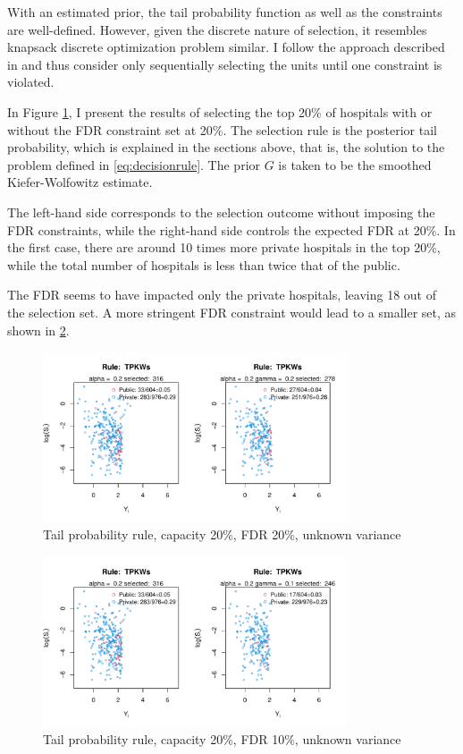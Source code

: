 \documentclass[12pt]{article}
\begin{document}
With an estimated prior, the tail probability function as well as the
constraints are well-defined. However, given the discrete nature of selection,
it resembles knapsack discrete optimization problem similar. I follow the
approach described in \cite{basu2018weighted} and thus consider only
sequentially selecting the units until one constraint is violated.

In Figure \ref{fig:tp_0.2_0.2_2d}, I present the results of selecting the top
20\% of hospitals with or without the FDR constraint set at 20\%. The selection
rule is the posterior tail probability, which is explained in the sections
above, that is, the solution to the problem defined in \ref{eq:decisionrule}.
The prior $G$ is taken to be the smoothed Kiefer-Wolfowitz estimate.

The left-hand side corresponds to the selection outcome without imposing the
FDR constraints, while the right-hand side controls the expected FDR at 20\%.
In the first case, there are around 10 times more private hospitals in the top
20\%, while the total number of hospitals is less than twice that of the
public.

The FDR seems to have impacted only the private hospitals, leaving 18 out of
the selection set. A more stringent FDR constraint would lead to a smaller set,
as shown in \ref{fig:tp_0.2_0.1_2d}.

\begin{figure}[h!]
    \centering
    \includegraphics[width=0.8\textwidth]{../../Figures/2013-2022/GMM_fd/GLVmix/Left_0.2_0.2_TPKWs.pdf}
    \caption{Tail probability rule, capacity 20\%, FDR 20\%, unknown variance}
    \label{fig:tp_0.2_0.2_2d}
\end{figure}

\begin{figure}[h!]
    \centering
    \includegraphics[width=0.8\textwidth]{../../Figures/2013-2022/GMM_fd/GLVmix/Left_0.2_0.1_TPKWs.pdf}
    \caption{Tail probability rule, capacity 20\%, FDR 10\%, unknown variance}
    \label{fig:tp_0.2_0.1_2d}
\end{figure}
\end{document}
